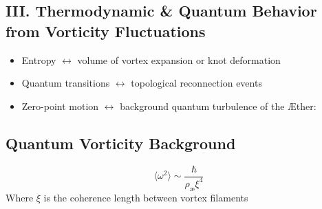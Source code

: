 \subsection*{III. Thermodynamic & Quantum Behavior from Vorticity Fluctuations}
\begin{itemize}
    \item Entropy \(\leftrightarrow\) volume of vortex expansion or knot deformation
    \item Quantum transitions \(\leftrightarrow\) topological reconnection events
    \item Zero-point motion \(\leftrightarrow\) background quantum turbulence of the Æther:
\end{itemize}
\subsection*{Quantum Vorticity Background}
\begin{equation}
    \langle \omega^2 \rangle \sim \frac{\hbar}{\rho_\text{æ} \xi^4}
\end{equation}
Where \(\xi\) is the coherence length between vortex filaments


